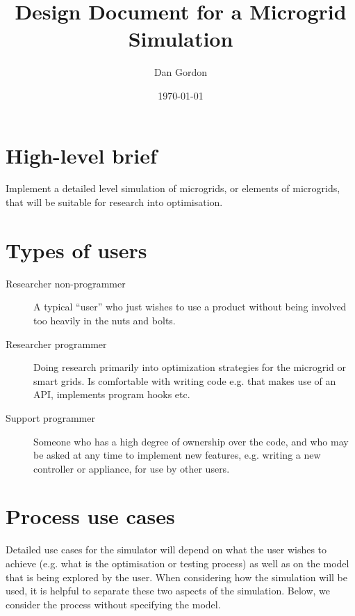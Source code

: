 \documentclass[12pt]{article}
\title{Design Document for a Microgrid Simulation}
\author{Dan Gordon}
\date{\today}
\begin{document}
\maketitle


\section{High-level brief} Implement a detailed level simulation of microgrids, or elements of microgrids, that will be suitable for research into optimisation.

\section{Types of users}

\begin{description}
\item[Researcher non-programmer] A typical ``user'' who just wishes to use a product without being involved too heavily in the nuts and bolts. 
\item[Researcher programmer] Doing research primarily into optimization strategies for the microgrid or smart grids. Is comfortable with writing code e.g. that makes use of an API, implements program hooks etc. 
\item[Support programmer] Someone who has a high degree of ownership over the code, and who may be asked at any time to implement new features, e.g. writing a new controller or appliance, for use by other users.
\end{description}

\section{Process use cases}
Detailed use cases for the simulator will depend on what the user wishes to achieve (e.g. what is the optimisation or testing process) as well as on the model that is being explored by the user. When considering how the simulation will be used, it is helpful to separate these two aspects of the simulation. Below, we consider the process without specifying the model.
\end{document}
